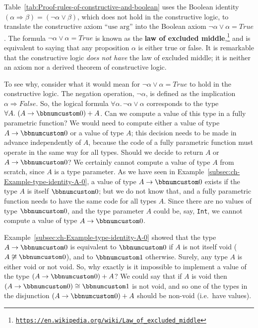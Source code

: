 Table~\ref{tab:Proof-rules-of-constructive-and-boolean} uses the
Boolean identity $\left(\alpha\Rightarrow\beta\right)=(\neg\alpha\vee\beta)$,
which does not hold in the constructive logic, to translate the constructive
axiom ``$\text{use arg}$'' into the Boolean axiom $\neg\alpha\vee\alpha=True$.
The formula $\neg\alpha\vee\alpha=True$ is known as the \textbf{law
of excluded middle},\footnote{\texttt{\href{https://en.wikipedia.org/wiki/Law_of_excluded_middle}{https://en.wikipedia.org/wiki/Law\_of\_excluded\_middle}}}
and is equivalent to saying that any proposition $\alpha$ is either
true or false. It is remarkable that the constructive logic \emph{does
not have} the law of excluded middle; it is neither an axiom nor a
derived theorem of constructive logic. 

To see why, consider what it would mean for $\neg\alpha\vee\alpha=True$
to hold in the constructive logic. The negation operation, $\neg\alpha$,
is defined as the implication $\alpha\Rightarrow False$. So, the
logical formula $\forall\alpha.\,\neg\alpha\vee\alpha$ corresponds
to the type $\forall A.\,\left(A\rightarrow\bbnum 0\right)+A$. Can
we compute a value of this type in a fully parametric function? We
would need to compute either a value of type $A\rightarrow\bbnum 0$
or a value of type $A$; this decision needs to be made in advance
independently of $A$, because the code of a fully parametric function
must operate in the same way for all types. Should we decide to return
$A$ or $A\rightarrow\bbnum 0$? We certainly cannot compute a value
of type $A$ from scratch, since $A$ is a type parameter. As we have
seen in Example~\ref{subsec:ch-Example-type-identity-A-0}, a value
of type $A\rightarrow\bbnum 0$ exists if the type $A$ is itself
$\bbnum 0$; but we do not know that, and a fully parametric function
needs to have the same code for all types $A$. Since there are no
values of type $\bbnum 0$, and the type parameter $A$ could be,
say, \lstinline!Int!, we cannot compute a value of type $A\rightarrow\bbnum 0$.

Example~\ref{subsec:ch-Example-type-identity-A-0} showed that the
type $A\rightarrow\bbnum 0$ is equivalent to $\bbnum 0$ if $A$
is not itself void ($A\not\cong\bbnum 0$), and to $\bbnum 1$ otherwise.
Surely, any type $A$ is either void or not void. So, why exactly
is it impossible to implement a value of the type $\left(A\rightarrow\bbnum 0\right)+A$?
We could say that if $A$ is void then $\left(A\rightarrow\bbnum 0\right)\cong\bbnum 1$
is not void, and so one of the types in the disjunction $\left(A\rightarrow\bbnum 0\right)+A$
should be non-void (i.e.~have values).

